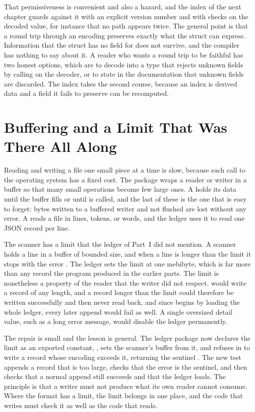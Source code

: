 That permissiveness is convenient and also a hazard, and the index of the next chapter guards against it with an explicit version number and with checks on the decoded value, for instance that no path appears twice. The general point is that a round trip through an encoding preserves exactly what the struct can express. Information that the struct has no field for does not survive, and the compiler has nothing to say about it. A reader who wants a round trip to be faithful has two honest options, which are to decode into a type that rejects unknown fields by calling  on the decoder, or to state in the documentation that unknown fields are discarded. The index takes the second course, because an index is derived data and a field it fails to preserve can be recomputed.

\section{Buffering and a Limit That Was There All Along}

Reading and writing a file one small piece at a time is slow, because each call to the operating system has a fixed cost. The package  wraps a reader or writer in a buffer so that many small operations become few large ones. A  holds its data until the buffer fills or until  is called, and the last of these is the one that is easy to forget: bytes written to a buffered writer and not flushed are lost without any error. A  reads a file in lines, tokens, or words, and the ledger uses it to read one JSON record per line.

The scanner has a limit that the ledger of Part~I did not mention. A scanner holds a line in a buffer of bounded size, and when a line is longer than the limit it stops with the error . The ledger sets the limit at one mebibyte, which is far more than any record the program produced in the earlier parts. The limit is nonetheless a property of the reader that the writer did not respect.  would write a record of any length, and a record longer than the limit could therefore be written successfully and then never read back, and since  begins by loading the whole ledger, every later append would fail as well. A single oversized detail value, such as a long error message, would disable the ledger permanently.

The repair is small and the lesson is general. The ledger package now declares the limit as an exported constant, , sets the scanner's buffer from it, and refuses in  to write a record whose encoding exceeds it, returning the sentinel . The new test appends a record that is too large, checks that the error is the sentinel, and then checks that a normal append still succeeds and that the ledger loads. The principle is that a writer must not produce what its own reader cannot consume. Where the format has a limit, the limit belongs in one place, and the code that writes must check it as well as the code that reads.

